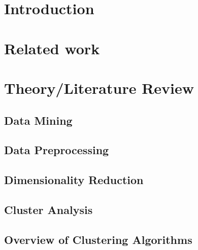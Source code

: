 \section{Introduction}
\label{section:Introduction}




\section{Related work}
\label{section:RelatedWork}




\section{Theory/Literature Review}
\label{section:Theory}
% 

  \subsection{Data Mining}
  \label{section:TheoryDataMining}
  
    
  \subsection{Data Preprocessing}
  \label{section:TheoryDataPreprocessing}
  

  \subsection{Dimensionality Reduction}
  \label{section:TheoryDimensionalityReduction}
  
  
  \subsection{Cluster Analysis}
  \label{section:TheoryClusterAnalysis}
  

  \subsection{Overview of Clustering Algorithms}
  \label{section:TheoryOverviewClusteringAlgorithms}
  

